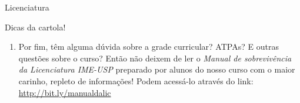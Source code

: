 \begin{subsecao}{Licenciatura}
\begin{subsubsecao}{Dicas da cartola!}
\begin{enumerate}
 Licenciatura. Vocês podem e devem aproveitar essas oportunidades, caso queiram! Sejam pesquisas
 em temas da matemática pura ou na Educação Matemática, elas contribuem muito para a nossa formação.
 \item Por fim, têm alguma dúvida sobre a grade curricular? ATPAs? E outras questões sobre o curso?
Então não deixem de ler o \textit{Manual de sobrevivência da Licenciatura IME-USP} preparado por alunos
do nosso curso com o maior carinho, repleto de informações! Podem acessá-lo através
do link: \url{http://bit.ly/manualdalic}

\end{enumerate}

\end{subsubsecao}

\end{subsecao}
